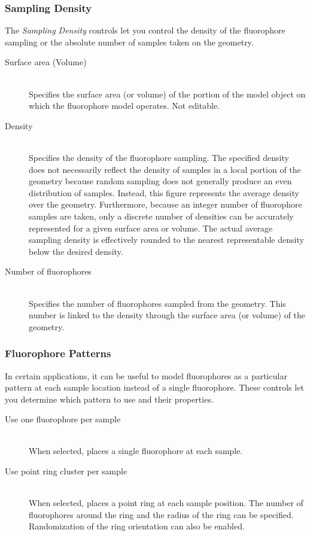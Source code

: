 \documentclass[11pt,titlepage,twoside]{article}
\begin{document}
\subsubsection{Sampling Density}

The \emph{Sampling Density} controls let you control the density of the fluorophore sampling or the absolute number of samples taken on the geometry.

\begin{description}

\item[Surface area (Volume)] \hfill \\
Specifies the surface area (or volume) of the portion of the model object on which the fluorophore model operates. Not editable.

\item[Density] \hfill \\
Specifies the density of the fluorophore sampling. The specified density does not necessarily reflect the density of samples in a local portion of the geometry because random sampling does not generally produce an even distribution of samples. Instead, this figure represents the average density over the geometry. Furthermore, because an integer number of fluorophore samples are taken, only a discrete number of densities can be accurately represented for a given surface area or volume. The actual average sampling density is effectively rounded to the nearest representable density below the desired density.

\item[Number of fluorophores] \hfill \\
Specifies the number of fluorophores sampled from the geometry. This number is linked to the density through the surface area (or volume) of the geometry.

\end{description}

\subsubsection{Fluorophore Patterns}

In certain applications, it can be useful to model fluorophores as a particular pattern at each sample location instead of a single fluorophore. These controls let you determine which pattern to use and their properties.

\begin{description}

\item[Use one fluorophore per sample] \hfill \\
When selected, places a single fluorophore at each sample.

\item[Use point ring cluster per sample] \hfill \\
When selected, places a point ring at each sample position. The number of fluorophores around the ring and the radius of the ring can be specified. Randomization of the ring orientation can also be enabled.

\end{description}
\end{document}
